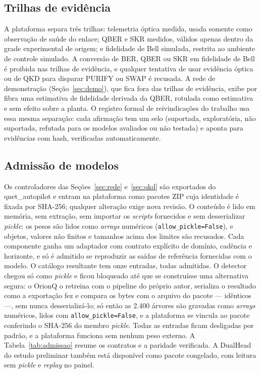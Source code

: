 \documentclass[12pt]{article}
\begin{document}
\subsection{Trilhas de evidência}

A plataforma separa três trilhas: telemetria óptica medida, usada somente como
observação de saúde do enlace; QBER e SKR medidos, válidos apenas dentro da
grade experimental de origem; e fidelidade de Bell simulada, restrita ao
ambiente de controle simulado. A conversão de BER, QBER ou SKR em fidelidade de
Bell é proibida nas trilhas de evidência, e qualquer tentativa de usar evidência
óptica ou de QKD para disparar PURIFY ou SWAP é recusada. A rede de
demonstração (Seção~\ref{sec:demo}), que fica fora das trilhas de evidência,
exibe por fibra uma estimativa de fidelidade derivada da QBER, rotulada como
estimativa e sem efeito sobre a planta. O registro formal de reivindicações do
trabalho usa essa mesma separação: cada afirmação tem um selo (suportada,
exploratória, não suportada, refutada para os modelos avaliados ou não testada)
e aponta para evidências com hash, verificadas automaticamente.

\subsection{Admissão de modelos}

Os controladores das Seções~\ref{sec:rede} e~\ref{sec:qkd} são exportados do
qnet\_autopilot e entram na plataforma como pacotes ZIP cuja identidade é
fixada por SHA-256;
qualquer alteração exige nova revisão. O conteúdo é lido em memória, sem
extração, sem importar os \textit{scripts} fornecidos e sem desserializar
\textit{pickle}: os pesos são lidos como \textit{arrays} numéricos
(\texttt{allow\_pickle=False}), e objetos, valores não finitos e tamanhos acima
dos limites são recusados. Cada componente ganha um adaptador com contrato
explícito de domínio, cadência e horizonte, e só é admitido se reproduzir as
saídas de referência fornecidas com o modelo. O catálogo resultante tem onze
entradas, todas admitidas. O detector chegou só como \textit{pickle} e ficou
bloqueado até que se construísse uma alternativa segura: o OrionQ o retreina com
o pipeline do próprio autor, serializa o resultado como a exportação fez e
compara os bytes com o arquivo do pacote --- idênticos ---, sem nunca
desserializá-lo; só então as 2.400 árvores são gravadas como \textit{arrays}
numéricos, lidos com \texttt{allow\_pickle=False}, e a plataforma se vincula ao
pacote conferindo o SHA-256 do membro \textit{pickle}. Todas as entradas ficam
desligadas por padrão, e a plataforma funciona sem nenhum peso externo. A Tabela~\ref{tab:admissao} resume os
contratos e a paridade verificada. A DualHead do estudo preliminar também está
disponível como pacote congelado, com leitura sem \textit{pickle} e
\textit{replay} no painel.
\end{document}
